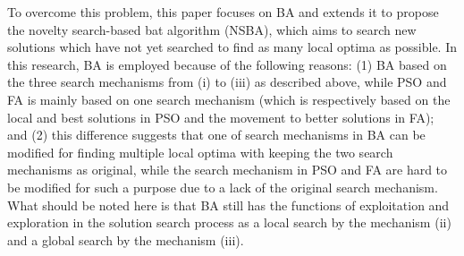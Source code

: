 \documentclass{ies2018}
\begin{document}
To overcome this problem, this paper focuses on BA and extends it to propose the novelty search-based bat algorithm (NSBA), which aims to search new solutions which have not yet searched to find as many local optima as possible. In this research, BA is employed because of the following reasons: (1) BA based on the three search mechanisms from (i) to (iii) as described above, while PSO and FA is mainly based on one search mechanism (which is respectively based on the local and best solutions in PSO and the movement to better solutions in FA); and (2) this difference suggests that one of search mechanisms in BA can be modified for finding multiple local optima with keeping the two search mechanisms as original, while the search mechanism in PSO and FA are hard to be modified for such a purpose due to a lack of the original search mechanism. What should be noted here is that BA still has the functions of exploitation and exploration in the solution search process as a local search by the mechanism (ii) and a global search by the mechanism (iii). 
 
\end{document}
